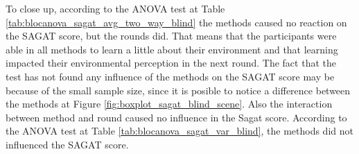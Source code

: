 
%

To close up, according to the ANOVA test at Table \ref{tab:blocanova_sagat_avg_two_way_blind} the methods caused no reaction on the SAGAT score, but the rounds did. That means that the participants were able in all methods to learn a little about their environment and that learning impacted their environmental perception in the next round. The fact that the test has not found any influence of the methods on the SAGAT score may be because of the small sample size, since it is posible to notice a difference between the methods at Figure \ref{fig:boxplot_sagat_blind_scene}. Also the interaction between method and round caused no influence in the Sagat score. According to the ANOVA test at Table \ref{tab:blocanova_sagat_var_blind}, the methods did not influenced the SAGAT score.

\FloatBarrier